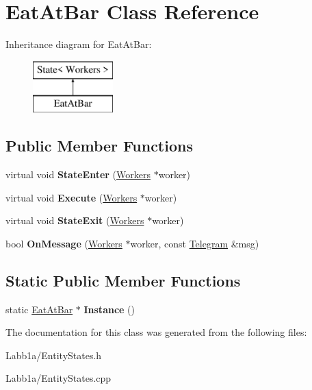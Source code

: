\hypertarget{class_eat_at_bar}{}\section{Eat\+At\+Bar Class Reference}
\label{class_eat_at_bar}
Inheritance diagram for Eat\+At\+Bar\+:\begin{figure}[H]
\begin{center}
\leavevmode
\includegraphics[height=2.000000cm]{class_eat_at_bar}
\end{center}
\end{figure}
\subsection*{Public Member Functions}
\begin{DoxyCompactItemize}
\item 
\hypertarget{class_eat_at_bar_ad05d58b203450c21976326eb1a54ce07}{}virtual void {\bfseries State\+Enter} (\hyperlink{class_workers}{Workers} $\ast$worker)\label{class_eat_at_bar_ad05d58b203450c21976326eb1a54ce07}

\item 
\hypertarget{class_eat_at_bar_ab49293e714036c86c1e1945d3ca8cdce}{}virtual void {\bfseries Execute} (\hyperlink{class_workers}{Workers} $\ast$worker)\label{class_eat_at_bar_ab49293e714036c86c1e1945d3ca8cdce}

\item 
\hypertarget{class_eat_at_bar_ad7d3e2d4a470e785643803691f57cf71}{}virtual void {\bfseries State\+Exit} (\hyperlink{class_workers}{Workers} $\ast$worker)\label{class_eat_at_bar_ad7d3e2d4a470e785643803691f57cf71}

\item 
\hypertarget{class_eat_at_bar_a9a63824bb51ef611a7ed95f21e917739}{}bool {\bfseries On\+Message} (\hyperlink{class_workers}{Workers} $\ast$worker, const \hyperlink{struct_telegram}{Telegram} \&msg)\label{class_eat_at_bar_a9a63824bb51ef611a7ed95f21e917739}

\end{DoxyCompactItemize}
\subsection*{Static Public Member Functions}
\begin{DoxyCompactItemize}
\item 
\hypertarget{class_eat_at_bar_a126d5fbc290f152f4b10d1dea88623af}{}static \hyperlink{class_eat_at_bar}{Eat\+At\+Bar} $\ast$ {\bfseries Instance} ()\label{class_eat_at_bar_a126d5fbc290f152f4b10d1dea88623af}

\end{DoxyCompactItemize}


The documentation for this class was generated from the following files\+:\begin{DoxyCompactItemize}
\item 
Labb1a/Entity\+States.\+h\item 
Labb1a/Entity\+States.\+cpp\end{DoxyCompactItemize}
